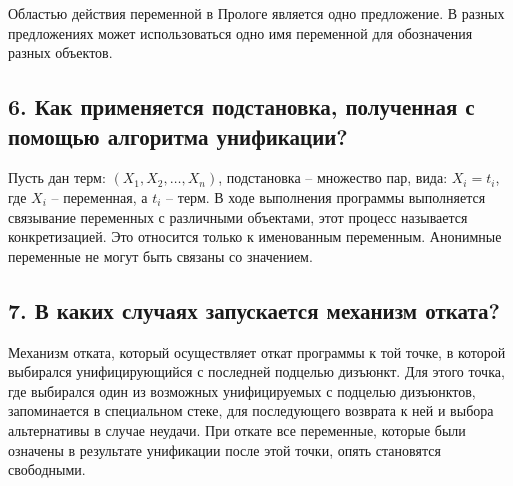 Областью действия переменной в Прологе является одно предложение. В разных предложениях может использоваться одно имя переменной для обозначения разных объектов.

\subsection*{6. Как применяется подстановка, полученная с помощью алгоритма унификации?}

Пусть дан терм: $(X_1, X_2,\dots, X_n)$, подстановка -- множество пар, вида: ${X_i = t_i}$, где $X_i$ -- переменная, а $t_i$ -- терм. В ходе выполнения программы выполняется связывание переменных с различными объектами, этот процесс называется конкретизацией. Это относится только к именованным переменным. Анонимные переменные не могут быть связаны со значением.

\subsection*{7. В каких случаях запускается механизм отката?}

Механизм отката, который осуществляет откат программы к той точке, в которой выбирался унифицирующийся с последней подцелью дизъюнкт. Для этого точка, где выбирался один из возможных унифицируемых с подцелью дизъюнктов, запоминается в специальном стеке, для последующего возврата к ней и выбора альтернативы в случае неудачи. При откате все переменные, которые были означены в результате унификации после этой точки, опять становятся свободными.
